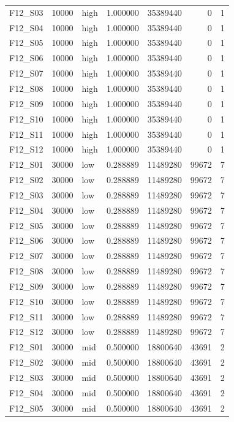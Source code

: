 \begin{longtable}{lllr r r r}
F12\_S03 & 10000 & high & 1.000000 & 35389440 & 0 & 1 \\
F12\_S04 & 10000 & high & 1.000000 & 35389440 & 0 & 1 \\
F12\_S05 & 10000 & high & 1.000000 & 35389440 & 0 & 1 \\
F12\_S06 & 10000 & high & 1.000000 & 35389440 & 0 & 1 \\
F12\_S07 & 10000 & high & 1.000000 & 35389440 & 0 & 1 \\
F12\_S08 & 10000 & high & 1.000000 & 35389440 & 0 & 1 \\
F12\_S09 & 10000 & high & 1.000000 & 35389440 & 0 & 1 \\
F12\_S10 & 10000 & high & 1.000000 & 35389440 & 0 & 1 \\
F12\_S11 & 10000 & high & 1.000000 & 35389440 & 0 & 1 \\
F12\_S12 & 10000 & high & 1.000000 & 35389440 & 0 & 1 \\
F12\_S01 & 30000 & low & 0.288889 & 11489280 & 99672 & 7 \\
F12\_S02 & 30000 & low & 0.288889 & 11489280 & 99672 & 7 \\
F12\_S03 & 30000 & low & 0.288889 & 11489280 & 99672 & 7 \\
F12\_S04 & 30000 & low & 0.288889 & 11489280 & 99672 & 7 \\
F12\_S05 & 30000 & low & 0.288889 & 11489280 & 99672 & 7 \\
F12\_S06 & 30000 & low & 0.288889 & 11489280 & 99672 & 7 \\
F12\_S07 & 30000 & low & 0.288889 & 11489280 & 99672 & 7 \\
F12\_S08 & 30000 & low & 0.288889 & 11489280 & 99672 & 7 \\
F12\_S09 & 30000 & low & 0.288889 & 11489280 & 99672 & 7 \\
F12\_S10 & 30000 & low & 0.288889 & 11489280 & 99672 & 7 \\
F12\_S11 & 30000 & low & 0.288889 & 11489280 & 99672 & 7 \\
F12\_S12 & 30000 & low & 0.288889 & 11489280 & 99672 & 7 \\
F12\_S01 & 30000 & mid & 0.500000 & 18800640 & 43691 & 2 \\
F12\_S02 & 30000 & mid & 0.500000 & 18800640 & 43691 & 2 \\
F12\_S03 & 30000 & mid & 0.500000 & 18800640 & 43691 & 2 \\
F12\_S04 & 30000 & mid & 0.500000 & 18800640 & 43691 & 2 \\
F12\_S05 & 30000 & mid & 0.500000 & 18800640 & 43691 & 2 \\

\end{longtable}
